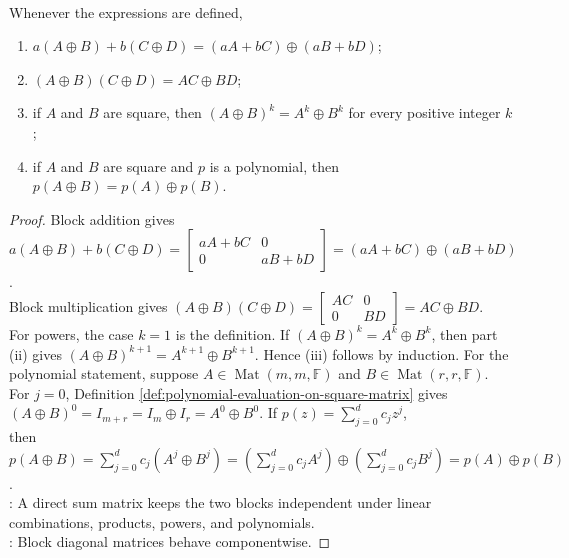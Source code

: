 \begin{proposition} \label{prop:direct-sum-matrix-algebra} \\
Whenever the expressions are defined,
\begin{enumerate}[label=(\roman*)]
\setlength{\itemsep}{0pt}
\item $a(A\oplus B)+b(C\oplus D)=(aA+bC)\oplus(aB+bD)$;
\item $(A\oplus B)(C\oplus D)=AC\oplus BD$;
\item if $A$ and $B$ are square, then $(A\oplus B)^k=A^k\oplus B^k$ for every positive integer $k$;
\item if $A$ and $B$ are square and $p$ is a polynomial, then $p(A\oplus B)=p(A)\oplus p(B)$.
\end{enumerate}
\begin{proof}
Block addition gives $a(A\oplus B)+b(C\oplus D)
=
\begin{bmatrix}
aA+bC&0\\
0&aB+bD
\end{bmatrix}
=(aA+bC)\oplus(aB+bD)$.\\
Block multiplication gives $(A\oplus B)(C\oplus D)
=
\begin{bmatrix}
AC&0\\
0&BD
\end{bmatrix}
=AC\oplus BD$.\\
For powers, the case $k=1$ is the definition. If $(A\oplus B)^k=A^k\oplus B^k$, then part (ii) gives $(A\oplus B)^{k+1}=A^{k+1}\oplus B^{k+1}$. Hence (iii) follows by induction. For the polynomial statement, suppose $A\in\operatorname{Mat}(m,m,\mathbb{F})$ and $B\in\operatorname{Mat}(r,r,\mathbb{F})$. For $j=0$, Definition \ref{def:polynomial-evaluation-on-square-matrix} gives $(A\oplus B)^0=I_{m+r}=I_m\oplus I_r=A^0\oplus B^0$. If $p(z)=\sum_{j=0}^{d}c_jz^j$,\\
then $p(A\oplus B)=\sum\limits_{j=0}^{d}c_j(A^j\oplus B^j) =\left(\sum\limits_{j=0}^{d}c_jA^j\right)\oplus\left(\sum\limits_{j=0}^{d}c_jB^j\right) =p(A)\oplus p(B)$.\\
: A direct sum matrix keeps the two blocks independent under linear combinations, products, powers, and polynomials.\\
: Block diagonal matrices behave componentwise.
\end{proof}
\end{proposition}

